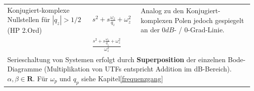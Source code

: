 \begin{landscape}
\begin{longtable}{|p{5cm}|l|ll|ll|}
		Konjugiert-komplexe Nullstellen
		für $|q_z| > 1/2$ (HP 2.Ord)&
		$s^2+s\frac{\omega_z}{q_z}+\omega_z^2$ &
		\multicolumn{4}{l|}{
			Analog zu den Konjugiert-komplexen Polen jedoch gespiegelt an der $0dB$- / $0$-Grad-Linie.
		}
		\\
		&
		$\frac{s^2+s\frac{\omega_z}{q_z}+\omega_z^2}{\omega_z^2}$ &
		\multicolumn{4}{l|}{}
		\\ \hline
		\multicolumn{6}{|p{21cm}|}{
			Serieschaltung von Systemen erfolgt durch \textbf{Superposition} der einzelnen Bode-Diagramme 
			(Multiplikation von UTFs entspricht Addition im	dB-Bereich). $\alpha , \beta \in \mathbf{R}$. 
			Für $\omega_p$ und $q_p$ siehe Kapitel\ref{frequenzgang}
		}
		\\ \hline
	\end{longtable}
	\renewcommand{\arraystretch}{\arraystretchOriginal}
\end{landscape}
\clearpage


